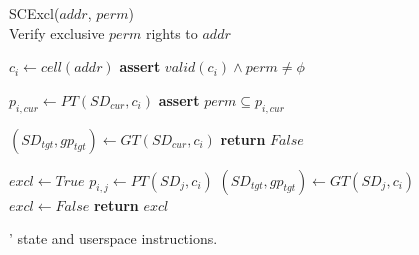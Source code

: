\begin{figure*}[!t]
\begin{multicols}{2}
    \begin{algorithm}[H]
      \caption{SCExcl($addr$, $perm$) \\
      Verify exclusive $perm$ rights to $addr$       }
      \begin{algorithmic}[1]

        \State $c_i \gets cell(addr)$
        \State \textbf{assert} $valid(c_i) \land perm \ne \phi$

        \State $p_{i,cur} \gets PT(SD_{cur}, c_i) $
        \State \textbf{assert} $perm \subseteq p_{i,cur}$

        \State $ (SD_{tgt}, gp_{tgt}) \gets GT(SD_{cur}, c_i)$
          \State \textbf{return} $False$
        \EndIf

        \State $excl \gets True$
          \State $p_{i,j} \gets PT(SD_j, c_i)$
          \State $(SD_{tgt}, gp_{tgt}) \gets GT(SD_j, c_i)$
            \State $excl \gets False$
          \EndIf
        \EndFor
        \State \textbf{return} $excl$
      \end{algorithmic}
      \label{alg:sccount}
    \end{algorithm}
    \vspace{-\baselineskip}
  \end{multicols}

  \caption[\seccells: State and userspace instructions.]
          {\seccells' state and userspace instructions.}
  \label{fig:seccell_ops_formal}
\end{figure*}
